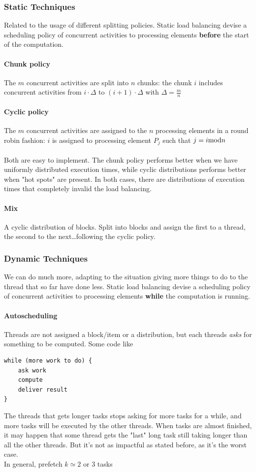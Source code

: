 \documentclass[10pt]{report}
\begin{document}
\subsubsection{Static Techniques}
Related to the usage of different splitting policies. Static load balancing devise a scheduling policy of concurrent activities to processing elements \textbf{before} the start of the computation.
\paragraph{Chunk policy} The $m$ concurrent activities are split into $n$ chunks: the chunk $i$ includes concurrent activities from $i\cdot\Delta$ to $(i+1)\cdot\Delta$ with $\Delta=\frac{m}{n}$
\paragraph{Cyclic policy} The $m$ concurrent activities are assigned to the $n$ processing elements in a round robin fashion: $i$ is assigned to processing element $P_j$ such that $j = i \hbox{mod} n$\\\\
Both are easy to implement. The chunk policy performs better when we have uniformly distributed execution times, while cyclic distributions performs better when "hot spots" are present. In both cases, there are distributions of execution times that completely invalid the load balancing.
\paragraph{Mix} A cyclic distribution of blocks. Split into blocks and assign the first to a thread, the second to the next\ldots following the cyclic policy.
\subsubsection{Dynamic Techniques}
We can do much more, adapting to the situation giving more things to do to the thread that so far have done less. Static load balancing devise a scheduling policy of concurrent activities to processing elements \textbf{while} the computation is running.
\paragraph{Autoscheduling} Threads are not assigned a block/item or a distribution, but each threads \textit{asks} for something to be computed. Some code like \begin{lstlisting}
while (more work to do) {
	ask work
	compute
	deliver result
}
\end{lstlisting}
The threads that gets longer tasks stops asking for more tasks for a while, and more tasks will be executed by the other threads. When tasks are almost finished, it may happen that some thread gets the "last" long task still taking longer than all the other threads. But it's not as impactful as stated before, as it's the worst case.\\
In general, prefetch $k \simeq 2$ or $3$ tasks
\end{document}
